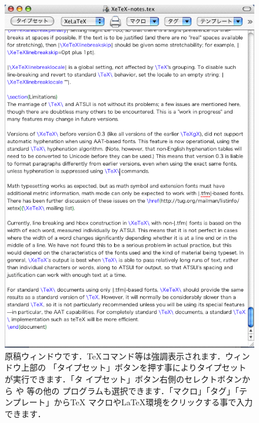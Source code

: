 \begin{figure}[htbp]
 \begin{center}
 \includegraphics[scale=.4]{images/TeXShop02} 
 \caption[\TeX shop の原稿ウィンドウ]{%
  原稿ウィンドウです．\TeX コマンド等は強調表示されます．ウィンドウ上部の
  「タイプセット」ボタンを押す事によりタイプセットが実行できます．「タ
  イプセット」ボタン右側のセレクトボタンから や \prog{\JBibTeX} 等の他の
  プログラムも選択できます．「マクロ」「タグ」「テンプレート」から\TeX
  マクロや\LaTeX 環境をクリックする事で入力できます．}
 \end{center}
\end{figure}

